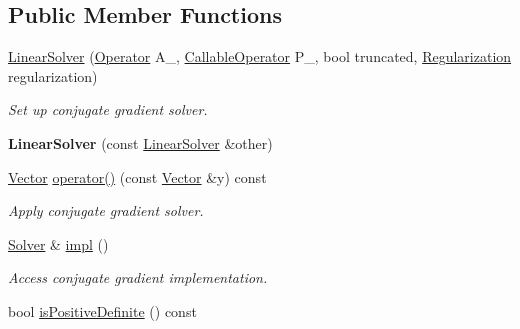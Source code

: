 \subsection*{Public Member Functions}
\begin{DoxyCompactItemize}
\item 
\hyperlink{classSpacy_1_1CG_1_1LinearSolver_a9e35ae0bec1829bf9010e9006be422ea}{Linear\-Solver} (\hyperlink{classSpacy_1_1Operator}{Operator} A\-\_\-, \hyperlink{namespaceSpacy_a022a87afa759e18781dd2aea9a80cd73}{Callable\-Operator} P\-\_\-, bool truncated, \hyperlink{classSpacy_1_1CG_1_1Regularization}{Regularization} regularization)
\begin{DoxyCompactList}\small\item\em Set up conjugate gradient solver. \end{DoxyCompactList}\item 
\hypertarget{classSpacy_1_1CG_1_1LinearSolver_a3c08d3c861d612d92168a350bc66c7dd}{{\bfseries Linear\-Solver} (const \hyperlink{classSpacy_1_1CG_1_1LinearSolver}{Linear\-Solver} \&other)}\label{classSpacy_1_1CG_1_1LinearSolver_a3c08d3c861d612d92168a350bc66c7dd}

\item 
\hypertarget{classSpacy_1_1CG_1_1LinearSolver_a5ee58f9858d840621a44658ceb721850}{\hyperlink{classSpacy_1_1Vector}{Vector} \hyperlink{classSpacy_1_1CG_1_1LinearSolver_a5ee58f9858d840621a44658ceb721850}{operator()} (const \hyperlink{classSpacy_1_1Vector}{Vector} \&y) const }\label{classSpacy_1_1CG_1_1LinearSolver_a5ee58f9858d840621a44658ceb721850}

\begin{DoxyCompactList}\small\item\em Apply conjugate gradient solver. \end{DoxyCompactList}\item 
\hypertarget{classSpacy_1_1CG_1_1LinearSolver_aa0aa5fdfdfd66e186fc86c35d7b49df6}{\hyperlink{classSpacy_1_1CG_1_1Solver}{Solver} \& \hyperlink{classSpacy_1_1CG_1_1LinearSolver_aa0aa5fdfdfd66e186fc86c35d7b49df6}{impl} ()}\label{classSpacy_1_1CG_1_1LinearSolver_aa0aa5fdfdfd66e186fc86c35d7b49df6}

\begin{DoxyCompactList}\small\item\em Access conjugate gradient implementation. \end{DoxyCompactList}\item 
\hypertarget{classSpacy_1_1CG_1_1LinearSolver_adec5404c595dc514a9c81c9ccc06cf41}{bool \hyperlink{classSpacy_1_1CG_1_1LinearSolver_adec5404c595dc514a9c81c9ccc06cf41}{is\-Positive\-Definite} () const }\label{classSpacy_1_1CG_1_1LinearSolver_adec5404c595dc514a9c81c9ccc06cf41}


\end{DoxyCompactItemize}
